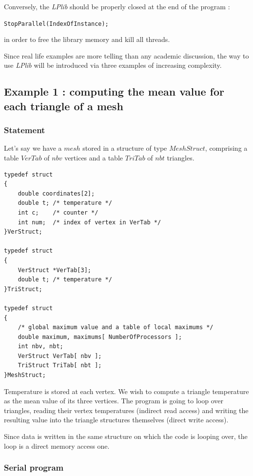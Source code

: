 \documentclass[a4paper,12pt]{article}
\begin{document}
\noindent Conversely, the \emph{LPlib} should be properly closed at the end of the program :

\medskip
\tt{StopParallel(IndexOfInstance);}
\normalfont
\medskip

\noindent in order to free the library memory and kill all threads.

Since real life examples are more telling than any academic discussion, the way to use \emph{LPlib} will be introduced via three examples of increasing complexity.

\subsection{Example 1 : computing the mean value for each triangle of a mesh}

\subsubsection{Statement}

Let's say we have a $mesh$ stored in a structure of type $MeshStruct$, comprising a table $VerTab$ of $nbv$ vertices and a table $TriTab$ of $nbt$ triangles.

\begin{tt}
\begin{verbatim}
typedef struct
{
    double coordinates[2];
    double t; /* temperature */
    int c;    /* counter */
    int num;  /* index of vertex in VerTab */
}VerStruct;

typedef struct
{
    VerStruct *VerTab[3];
    double t; /* temperature */
}TriStruct;

typedef struct
{
    /* global maximum value and a table of local maximums */
    double maximum, maximums[ NumberOfProcessors ];
    int nbv, nbt;
    VerStruct VerTab[ nbv ];
    TriStruct TriTab[ nbt ];
}MeshStruct;
\end{verbatim}
\end{tt}
\normalfont

Temperature is stored at each vertex. We wish to compute a triangle temperature as the mean value of its three vertices. The program is going to loop over triangles, reading their vertex temperatures (indirect read access) and writing the resulting value into the triangle structures themselves (direct write access).

Since data is written in the same structure on which the code is looping over, the loop is a direct memory access one.

\subsubsection{Serial program}
\end{document}
